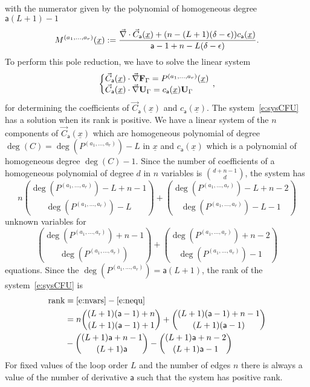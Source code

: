 \documentclass[a4paper,12pt]{article}
\numberwithin{equation}{section}
\numberwithin{figure}{section}
\begin{document}
with the numerator given by the polynomial of homogeneous degree $\mathsf{a}(L+1)-1$
\begin{equation}
  \label{e:Mfinal}
  M^{(a_1,\dots,a_r)}(\underline x):={\vec\nabla \cdot \vec C_{\mathsf{a}}
     (\underline x)
+  (n-(L+1)(\delta-\epsilon)) 
    c_{\mathsf{a}}(\underline x)\over \mathsf{a}-1+n-L(\delta-\epsilon) }.
\end{equation}
%
To perform this pole reduction, 
 we have to solve the linear system
\begin{equation}\label{e:sysCFU}
   \left\{\begin{array}{@{}l@{}}
\vec C_{\mathsf{a}} (\underline x) \cdot \vec \nabla \textbf{F}_\Gamma
            =    P^{(a_1,\dots,a_r)}(\underline x)\\
\vec C_{\mathsf{a}} (\underline x)\cdot\vec \nabla\textbf{U}_\Gamma= c_{{\mathsf{a}}}(\underline x) \textbf{U}_\Gamma 
  \end{array}\right.\,,
\end{equation}
for determining the coefficients of $\vec C_{\mathsf{a}}(\underline
x)$ and $c_{\mathsf{a}}(\underline x)$.
%
The system~\eqref{e:sysCFU} has a solution when its rank is positive.
We have a linear system of the $n$ components of $\vec C_{\mathsf{a}}(\underline
x) $ which are homogeneous polynomial of degree $\deg(C)=\deg( P^{(a_1,\dots,a_r)})-L $ in
$\underline x$ and  $ c_{{\mathsf{a}}}(\underline x) $ which is a polynomial of
homogeneous degree $\deg(C)-1$.   Since the number of coefficients of
a homogeneous polynomial of degree $d$ in $n$ variables is
$\binom{d+n-1}{d}$,  the system has
\begin{equation}\label{e:nvars}
n \binom{\deg( P^{(a_1,\dots,a_r)})-L+n-1}{\deg( P^{(a_1,\dots,a_r)})-L}+\binom{\deg( P^{(a_1,\dots,a_r)})-L+n-2}{\deg( P^{(a_1,\dots,a_r)})-L-1}
\end{equation} unknown variables for
\begin{equation}\label{e:nequ}
\binom{\deg( P^{(a_1,\dots,a_r)})+n-1}{\deg( P^{(a_1,\dots,a_r)})}+\binom{\deg( P^{(a_1,\dots,a_r)})+n-2}{\deg( P^{(a_1,\dots,a_r)})-1}
\end{equation}
equations.
%
%
Since the $\deg(P^{(a_1,\dots,a_r)})=\mathsf{a}(L+1)$, the rank of the system~\eqref{e:sysCFU} is
  \begin{align}
    \label{e:Rank}
    \textrm{rank}&=\eqref{e:nvars}-\eqref{e:nequ}\\
\nonumber    &=n \binom{(L+1)(\mathsf{a}-1)+n
               }{(L+1) (\mathsf{a}-1)+1}+\binom{(L+1)(\mathsf{a}-1)+n-1}{(L+1) (\mathsf{a}-1)}\cr
             \nonumber    &
                              -\binom{(L+1) \mathsf{a}+n-1}{(L+1) \mathsf{a}}-\binom{(L+1) \mathsf{a}+n-2}{(L+1) \mathsf{a}-1}
  \end{align}
For fixed values of the loop order $L$
and the number of edges $n$ there is always a value of the
number of derivative $\mathsf{a}$ such that the system has
positive rank.
\end{document}
